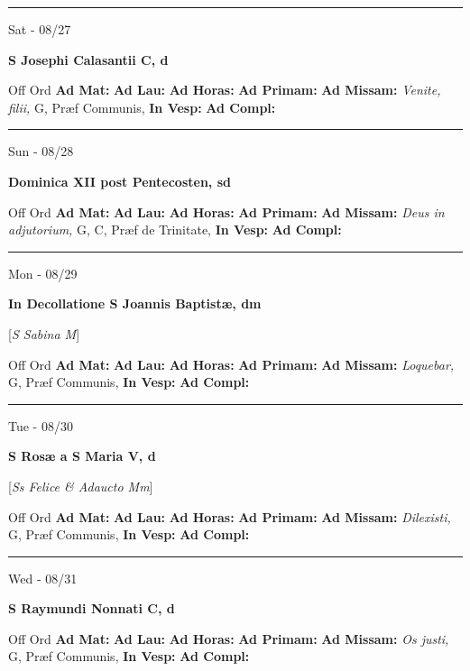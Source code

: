 \documentclass[letterpaper, 10pt]{article}
\begin{document}
\hrule
\begin{center}
Sat - 08/27
\end{center}\textbf{ \large S Josephi Calasantii C, \textnormal{\normalsize d}}
\begin{justify}
Off Ord
\textbf{Ad Mat: }
\textbf{Ad Lau: }
\textbf{Ad Horas: }
\textbf{Ad Primam: }
\textbf{Ad Missam:} \textit{Venite, filii, } G, Præf Communis, 
\textbf{In Vesp: }
\textbf{Ad Compl: }\end{justify}



\hrule
\begin{center}
Sun - 08/28
\end{center}\textbf{ \large Dominica XII post Pentecosten, \textnormal{\normalsize sd}}
\begin{justify}
Off Ord
\textbf{Ad Mat: }
\textbf{Ad Lau: }
\textbf{Ad Horas: }
\textbf{Ad Primam: }
\textbf{Ad Missam:} \textit{Deus in adjutorium, } G, C, Præf de Trinitate, 
\textbf{In Vesp: }
\textbf{Ad Compl: }\end{justify}



\hrule
\begin{center}
Mon - 08/29
\end{center}\textbf{ \large In Decollatione S Joannis Baptistæ, \textnormal{\normalsize dm}}

[\textit{S Sabina M}]
\begin{justify}
Off Ord
\textbf{Ad Mat: }
\textbf{Ad Lau: }
\textbf{Ad Horas: }
\textbf{Ad Primam: }
\textbf{Ad Missam:} \textit{Loquebar, } G, Præf Communis, 
\textbf{In Vesp: }
\textbf{Ad Compl: }\end{justify}



\hrule
\begin{center}
Tue - 08/30
\end{center}\textbf{ \large S Rosæ a S Maria V, \textnormal{\normalsize d}}

[\textit{Ss Felice \& Adaucto Mm}]
\begin{justify}
Off Ord
\textbf{Ad Mat: }
\textbf{Ad Lau: }
\textbf{Ad Horas: }
\textbf{Ad Primam: }
\textbf{Ad Missam:} \textit{Dilexisti, } G, Præf Communis, 
\textbf{In Vesp: }
\textbf{Ad Compl: }\end{justify}



\hrule
\begin{center}
Wed - 08/31
\end{center}\textbf{ \large S Raymundi Nonnati C, \textnormal{\normalsize d}}
\begin{justify}
Off Ord
\textbf{Ad Mat: }
\textbf{Ad Lau: }
\textbf{Ad Horas: }
\textbf{Ad Primam: }
\textbf{Ad Missam:} \textit{Os justi, } G, Præf Communis, 
\textbf{In Vesp: }
\textbf{Ad Compl: }\end{justify}
\end{document}

